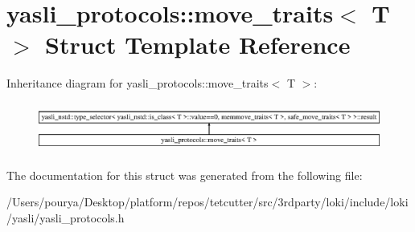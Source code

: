\hypertarget{structyasli__protocols_1_1move__traits}{}\section{yasli\+\_\+protocols\+:\+:move\+\_\+traits$<$ T $>$ Struct Template Reference}
\label{structyasli__protocols_1_1move__traits}
Inheritance diagram for yasli\+\_\+protocols\+:\+:move\+\_\+traits$<$ T $>$\+:\begin{figure}[H]
\begin{center}
\leavevmode
\includegraphics[height=1.649485cm]{structyasli__protocols_1_1move__traits}
\end{center}
\end{figure}


The documentation for this struct was generated from the following file\+:\begin{DoxyCompactItemize}
\item 
/\+Users/pourya/\+Desktop/platform/repos/tetcutter/src/3rdparty/loki/include/loki/yasli/yasli\+\_\+protocols.\+h\end{DoxyCompactItemize}
